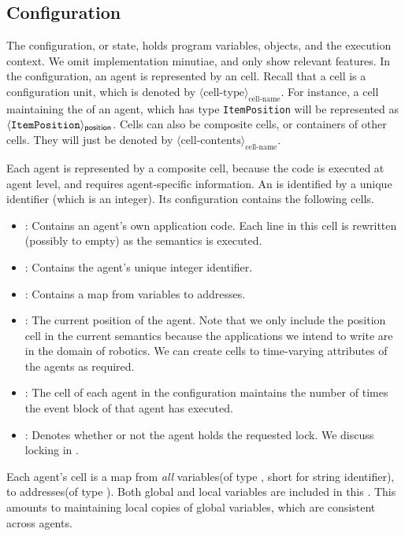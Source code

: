 \subsection[h]{Configuration}
The configuration, or state, holds program variables, objects, and the execution context. We omit implementation minutiae, and only show relevant features. In the configuration, an agent is represented by an  cell. Recall that a cell is a configuration unit, which is denoted by $\langle \mbox{cell-type} \rangle_{\mbox{cell-name}}$. For instance, a cell maintaining the  of an agent, which has type \verb|ItemPosition| will be represented as $\langle {\verb|ItemPosition|} \rangle_{\s{position}}$. Cells can also be composite cells, or containers of other cells. They will just be denoted by $\langle\mbox{cell-contents}\rangle_{\mbox{cell-name}}$.  

Each agent is represented by a composite cell, because the code is executed at agent level, and requires agent-specific information. An  is identified by a unique identifier  (which is an integer). Its configuration contains the following cells. 
\begin{itemize}
 \item  {} : Contains an agent's own application code. Each line in this cell is rewritten (possibly to empty) as the semantics is executed.
 \item {} : Contains the agent's unique integer identifier. 
 \item {} : Contains a map from variables to addresses. 
 \item  {} : The current position of the agent. Note that we only include the position cell in the current semantics because the applications we intend to write are in the domain of robotics. We can create cells to time-varying attributes of the agents as required.  
 \item  {} : The  cell of each agent in the configuration maintains the number of times the event block of that agent has executed.
 \item {} : Denotes whether or not the agent holds the requested lock. We discuss locking in . 
\end{itemize}

 Each agent's  cell is a map from \emph{all} variables(of type , short for string identifier), to addresses(of type ). Both global and local variables are included in this . This amounts to maintaining local copies of global variables, which are consistent across agents.  
 
